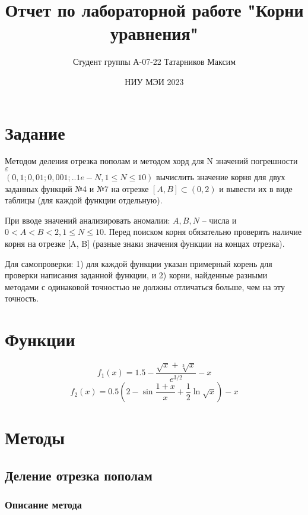 \documentclass[a4paper,12pt]{article}
\title{Отчет по лабораторной работе "Корни уравнения"}
\author{Студент группы А-07-22 Татарников Максим}
\date{НИУ МЭИ 2023}
\begin{document}
\maketitle
\tableofcontents

\newpage

\section{Задание}

Методом деления отрезка пополам и методом хорд для N значений погрешности $\varepsilon$\\ $(0,1; 0,01;0,001;..1e-N, 1 \leq N \leq 10)$ вычислить значение корня для двух заданных функций №4 и №7 на отрезке $[A, B] \subset (0,2)$ и вывести их в виде таблицы (для каждой функции отдельную).

При вводе значений анализировать аномалии: $A, B, N$ – числа и $0<A<B<2, 1 \leq N \leq 10$.
Перед поиском корня обязательно проверять наличие корня на отрезке [A, B]
(разные знаки значения функции на концах отрезка).

Для самопроверки: 1) для каждой функции указан примерный корень для проверки
написания заданной функции, и 2) корни, найденные разными методами с одинаковой
точностью не должны отличаться больше, чем на эту точность.


\section{Функции}
\begin{equation}
f_1(x) = 1.5 - \frac{\sqrt{x} + \sqrt[3]{x}}{e^{3/2}} - x
\end{equation}
\begin{equation}
f_2(x) = 0.5(2-\sin{\frac{1+x}{x}} + \frac{1}{2}\ln{\sqrt{x}}) - x
\end{equation}

\section{Методы}

\subsection{Деление отрезка пополам}

\subsubsection{Описание метода}
\end{document}
